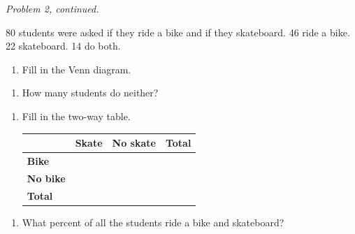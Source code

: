 \documentclass[11pt]{article}
\begin{document}
\begin{enumerate}
\newpage
\textit{Problem 2, continued.}

\vspace{0.6em}
80 students were asked if they ride a bike and if they skateboard. 46 ride a bike. 22 skateboard. 14 do both.

\vspace{0.4em}
\begin{minipage}[t]{0.4\linewidth}\vspace{0pt}\raggedright
\begin{enumerate}[start=6]
  \item Fill in the Venn diagram.

  \vspace{0.5em}
\end{enumerate}
\begin{enumerate}[start=8]
  \item How many students do neither?

\end{enumerate}
\end{minipage}\hfill
\begin{minipage}[t]{0.57\linewidth}\vspace{0pt}\raggedright
\begin{enumerate}[start=7]
  \item Fill in the two-way table.

  \vspace{0.5em}
  \renewcommand{\arraystretch}{1.7}
  \begin{tabular}{|l|C{0.7in}|C{0.7in}|C{0.7in}|}\hline
   & \textbf{Skate} & \textbf{No skate} & \textbf{Total} \\ \hline
  \textbf{Bike} &  &  &  \\ \hline
  \textbf{No bike} &  &  &  \\ \hline
  \textbf{Total} &  &  &  \\ \hline
  \end{tabular}
\end{enumerate}
\begin{enumerate}[start=9]
  \item What percent of all the students ride a bike and skateboard?

\end{enumerate}
\end{minipage}

\end{enumerate}
\end{document}

